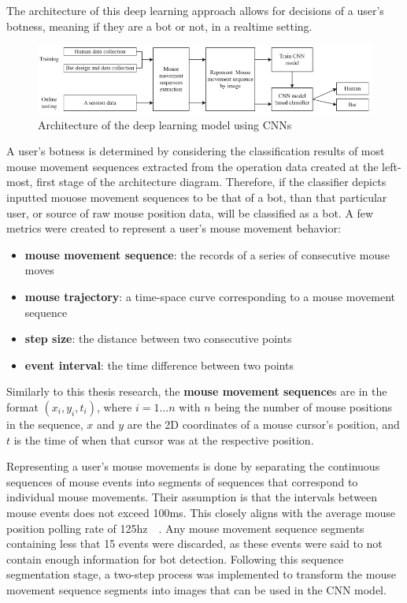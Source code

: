The architecture of this deep learning approach allows for decisions of a user's botness, meaning if they are a bot or not, in a realtime setting.
\begin{figure}[!h]
    \includegraphics[width=1\columnwidth]{figures/deep_learning_with_mouse_dynamics_system_architecture}
    \caption{Architecture of the deep learning model using CNNs}
    \label{fig:deep-learning-architecture}
\end{figure}
A user's botness is determined by considering the classification results of most mouse movement sequences extracted from the operation data created at the left-most, first stage of the architecture diagram.
Therefore, if the classifier depicts inputted mouose movement sequences to be that of a bot, than that particular user, or source of raw mouse position data, will be classified as a bot.
A few metrics were created to represent a user's mouse movement behavior:
\begin{itemize}
    \item \textbf{mouse movement sequence}: the records of a series of consecutive mouse moves
    \item \textbf{mouse trajectory}: a time-space curve corresponding to a mouse movement sequence
    \item \textbf{step size}: the distance between two consecutive points
    \item \textbf{event interval}: the time difference between two points
\end{itemize}
Similarly to this thesis research, the \textbf{mouse movement sequence}s are in the format $(x_i, y_i, t_i)$, where $i = 1{\dots}n$ with $n$ being the number of mouse positions in the sequence, $x$ and $y$ are the 2D coordinates of a mouse cursor's position, and $t$ is the time of when that cursor was at the respective position.

Representing a user's mouse movements is done by separating the continuous sequences of mouse events into segments of sequences that correspond to individual mouse movements.
Their assumption is that the intervals between mouse events does not exceed 100ms.
This closely aligns with the average mouse position polling rate of 125hz~\cite{mouse_dpi_and_polling_rate_explained}~\cite{mouse_dpi_and_usb_polling_rate}.
Any mouse movement sequence segments containing less that 15 events were discarded, as these events were said to not contain enough information for bot detection.
Following this sequence segmentation stage, a two-step process was implemented to transform the mouse movement sequence segments into images that can be used in the CNN model.

